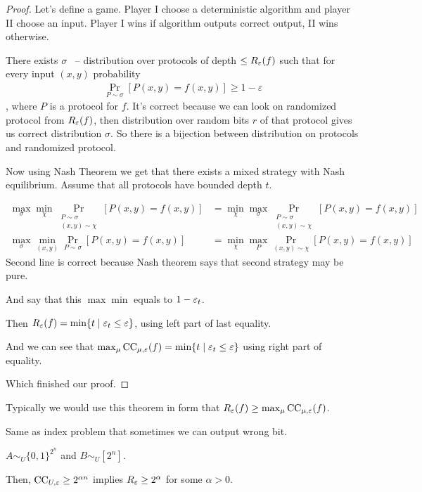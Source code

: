 \begin{proof}
	Let's define a game. Player I choose a deterministic algorithm and player II choose an input. Player I wins if algorithm outputs correct output, II wins otherwise.
	
	There exists $\sigma$ ~-- distribution over protocols of depth $\leq R_\varepsilon(f)$ such that for every input $(x, y)$ probability 
	\begin{align*}
		\Pr_{P \sim \sigma} [P(x, y) = f(x, y)] \geq 1 - \varepsilon
	\end{align*}, where $P$ is a protocol for $f$.
	It's correct because we can look on randomized protocol from $R_\varepsilon(f)$, then distribution over random bits $r$ of that protocol gives us correct distribution $\sigma$. So there is a bijection between distribution on protocols and randomized protocol.
	
 	Now using Nash Theorem we get that there exists a mixed strategy with Nash equilibrium. 
	Assume that all protocols have bounded depth $t$.
	
	\begin{align*}
		\max_\sigma \min_\chi \Pr_{\substack{P \sim \sigma \\ (x, y) \sim \chi}}[P(x, y) = f(x, y)] &= \min_\chi \max_\sigma \Pr_{\substack{P \sim \sigma \\ (x, y) \sim \chi}}[P(x, y) = f(x, y)] \\
		\max_\sigma \min_{(x, y)} \Pr_{P \sim \sigma}[P(x, y) = f(x, y)] &= \min_\chi \max_{P} \Pr_{(x, y) \sim \chi}[P(x, y) = f(x, y)]
	\end{align*}
	Second line is correct because Nash theorem says that second strategy may be pure.
	
	And say that this $\max \min$ equals to $1 - \varepsilon_t$.
	
	Then $R_\varepsilon(f) = \min \{t \mid \varepsilon_t \leq \varepsilon \}$, using left part of last equality.
	
	And we can see that $\max_\mu \operatorname{CC}_{\mu, \varepsilon}(f) = \min \{t \mid \varepsilon_t \leq \varepsilon\}$ using right part of equality.
	
	Which finished our proof.
\end{proof}

Typically we would use this theorem in form that $R_\varepsilon(f) \geq \max_\mu \operatorname{CC}_{\mu, \varepsilon}(f)$.

\begin{thm}
	Same as index problem that sometimes we can output wrong bit.
	
	$A \sim_U \{0, 1\}^{2^n}$ and $B \sim_U [2^n]$.
	
	Then, $\operatorname{CC}_{U, \varepsilon} \geq 2^{\alpha n}$ implies $R_\varepsilon \geq 2^{\alpha}$ for some $\alpha > 0$.
\end{thm}

